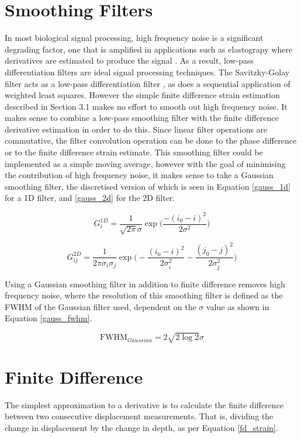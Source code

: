 \section{Smoothing Filters}
In most biological signal processing, high frequency noise is a significant degrading factor, one that is amplified in applications such as elastograpy where derivatives are estimated to produce the signal \cite{usui_digital_1982}. As a result, low-pass differentiation filters are ideal signal processing techniques. The Savitzky-Golay filter acts as a low-pass differentiation filter \cite{lou_axial_2004}, as does a sequential application of weighted least squares. However the simple finite difference strain estimation described in Section 3.1 makes no effort to smooth out high frequency noise. It makes sense to combine a low-pass smoothing filter with the finite difference derivative estimation in order to do this. Since linear filter operations are commutative, the filter convolution operation can be done to the phase difference or to the finite difference strain estimate. This smoothing filter could be implemented as a simple moving average, however with the goal of minimising the contribution of high frequency noise, it makes sense to take a Gaussian smoothing filter, the discretised version of which is seen in Equation \ref{gauss_1d} for a 1D filter, and \ref{gauss_2d} for the 2D filter.

\begin{equation}
	\label{gauss_1d}
	G^{1D}_i = \frac{1}{\sqrt{2\pi} \sigma} \exp{\bigg(\frac{-(i_0-i)^2}{2 \sigma^2}\bigg)}
\end{equation}

\begin{equation}
	\label{gauss_2d}
	G^{2D}_{ij} = \frac{1}{2\pi \sigma_i \sigma_j } \exp{ 
	\bigg( - \frac{(i_0 - i)^2}{2 \sigma_i^2} - \frac{(j_0 - j)^2}{2 \sigma_j^2} \bigg)}
\end{equation}

Using a Gaussian smoothing filter in addition to finite difference removes high frequency noise, where the resolution of this smoothing filter is defined as the FWHM of the Gaussian filter used, dependent on the $\sigma$ value as shown in Equation \ref{gauss_fwhm}.

\begin{equation}
	\label{gauss_fwhm}
	\text{FWHM}_{Gaussian} = 2 \sqrt{2 \log{2}} \sigma
\end{equation}

\section{Finite Difference}
The simplest approximation to a derivative is to calculate the finite difference between two consecutive displacement measurements. That is, dividing the change in displacement by the change in depth, as per Equation \ref{fd_strain}.


